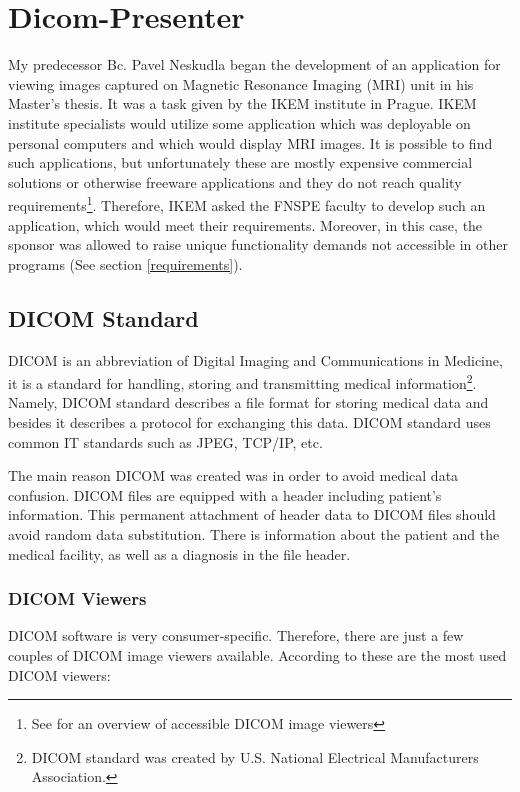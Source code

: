 \chapter{Dicom-Presenter}
\vspace{-10mm}
My predecessor Bc. Pavel Neskudla began the development of an application for viewing images captured on Magnetic Resonance Imaging (MRI) unit in his Master's thesis\cite{neskudla}. It was a task given by the IKEM institute in Prague. IKEM institute specialists would utilize some application which was deployable on personal computers and which would display MRI images. It is possible to find such applications, but unfortunately these are mostly expensive commercial solutions or otherwise freeware applications and they do not reach quality requirements\footnote{See \cite[page~9]{flaska_bc} for an overview of accessible DICOM image viewers}. Therefore, IKEM asked the FNSPE faculty to develop such an application, which would meet their requirements. Moreover, in this case, the sponsor was allowed to raise unique functionality demands not accessible in other programs (See section \ref{requirements}).

\section{DICOM Standard}

DICOM is an abbreviation of Digital Imaging and Communications in Medicine, it is a standard for handling, storing and transmitting medical information\footnote{DICOM standard was created by  U.S. National Electrical Manufacturers Association.}. Namely, DICOM standard describes a file format for storing medical data and besides it describes a protocol for exchanging this data. DICOM standard uses common IT standards such as JPEG, TCP/IP, etc. \cite{dicombook}

The main reason DICOM was created was in order to avoid medical data confusion. DICOM files are equipped with a header including patient's information. This permanent attachment of header data to DICOM files should avoid random data substitution. There is information about the patient and the medical facility, as well as a diagnosis in the file header.

\subsection{DICOM Viewers}
\label{viewers}
DICOM software is very consumer-specific. Therefore, there are just a few couples of DICOM image viewers available. According to  these are the most used DICOM viewers:


